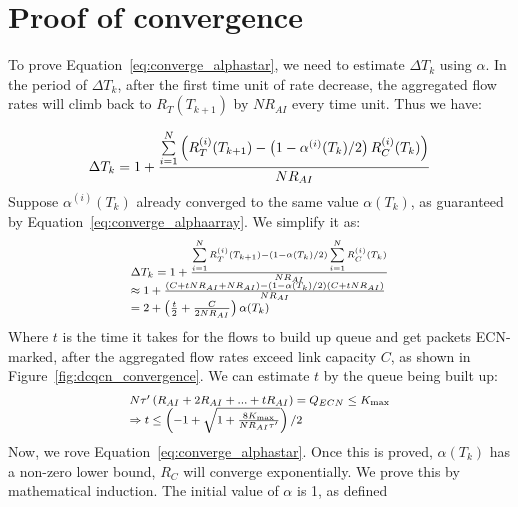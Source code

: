 \section{Proof of convergence}
\label{sec:alpha_proof}
To prove Equation~\ref{eq:converge_alphastar}, we need to estimate $\Delta T_k$
using $\alpha$. In the period of $\Delta T_k$, after the first time unit of rate
decrease, the aggregated flow rates will climb back to $R_T(T_{k+1})$ by
$NR_{AI}$ every time unit.  Thus we have:

\begin{equation}
\small\Delta {T_k} = 1 + \frac{{\sum\limits_{i = 1}^N {\left( {R_T^{(i)}({T_{k + 1}}) - \left( {1 - {\alpha ^{(i)}}({T_k})/2} \right)R_C^{(i)}({T_k})} \right)} }}{{N{R_{AI}}}}
\end{equation}
Suppose $\alpha^{(i)}({T_k})$ already converged to the same value $\alpha ({T_k})$, as guaranteed by
Equation~\ref{eq:converge_alphaarray}. We simplify it as:
\begin{equation}
\small
\begin{array}{l}
\Delta {T_k} = 1 + \frac{{\sum\limits_{i = 1}^N {R_T^{(i)}({T_{k + 1}})}  - \left( {1 - \alpha ({T_k})/2} \right)\sum\limits_{i = 1}^N {R_C^{(i)}({T_k})} }}{{N{R_{AI}}}}\\
 \approx 1 + \frac{{\left( {C + tN{R_{AI}} + N{R_{AI}}} \right) - \left( {1 - \alpha ({T_k})/2} \right)\left( {C + tN{R_{AI}}} \right)}}{{N{R_{AI}}}}\\
 = 2 + \left( {\frac{t}{2} + \frac{C}{{2N{R_{AI}}}}} \right)\alpha ({T_k})
\end{array}
\label{eq:converge_tk}
\end{equation}
Where $t$ is the time it takes for the flows to build up queue and get packets ECN-marked, after
the aggregated flow rates exceed link capacity $C$, as shown in Figure~\ref{fig:dcqcn_convergence}.
We can estimate $t$ by the queue being built up:
\begin{equation}
\small
\begin{array}{l}
N\tau '\left( {{R_{AI}} + 2{R_{AI}} + ... + t{R_{AI}}} \right) = {Q_{ECN}} \le {K_{\max }}\\
 \Rightarrow t \le \left( { - 1 + \sqrt {1 + \frac{{8{K_{\max }}}}{{N{R_{AI}}\tau '}}} } \right)/2
\end{array}
\end{equation}
Now, we rove Equation~\ref{eq:converge_alphastar}.
Once this is proved, $\alpha ({T_k})$ has a non-zero lower bound, $R_C$ will converge exponentially.
We prove this by mathematical induction. The initial value of $\alpha$ is 1, as defined
